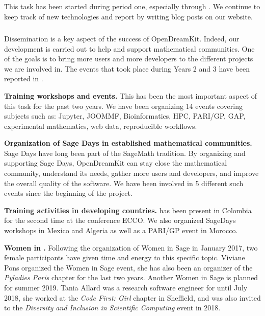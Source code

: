 \subparagraph{}

This task has been started during period one, especially through . We continue
to keep track of new technologies and report by writing blog posts on our website.


\subparagraph{}
\label{dissem@dissemination}

Dissemination is a key aspect of the success of OpenDreamKit. Indeed, our development is carried
out to help and support mathematical communities. One of the goals is to bring
more users and more developers to the different projects we are involved in. The events
that took place during Years 2 and 3 have been reported in .

\begin{compactitem}
\item \textbf{Training workshops and events.} This has been the most important aspect of this task
for the past two years. We have been organizing 14 events covering subjects such as: Jupyter, JOOMMF,
Bioinformatics, HPC, PARI/GP, GAP, experimental mathematics, web data, reproducible workflows.
\item \textbf{Organization of Sage Days in established mathematical communities.} Sage Days have long been
part of the SageMath tradition. By organizing and supporting Sage Days, OpenDreamKit can stay close
the mathematical community, understand its needs, gather more users and developers, and improve
the overall quality of the software. We have been involved in 5 different such events since the beginning
of the project.
\item \textbf{Training activities in developing countries.} \ODK has been present in Colombia for the second time at
the conference ECCO. We also organized SageDays workshops in Mexico and Algeria as well as a PARI/GP event in Morocco.
\item \textbf{Women in \ODK.} Following the organization of Women in Sage in January 2017, two female \ODK participants
have given time and energy to this specific topic. Viviane Pons organized the Women in Sage event, she has also been
an organizer of the \textit{Pyladies Paris} chapter for the last two years. Another Women in Sage is planned for summer 2019. Tania
Allard was a research software engineer for \ODK until July 2018, she worked at the \textit{Code First: Girl} chapter in
Sheffield, and was also invited to the \textit{Diversity and Inclusion in Scientific Computing} event in 2018.
\end{compactitem}


